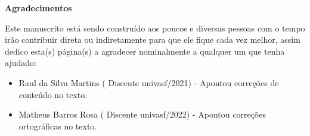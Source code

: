 \begingroup
\thispagestyle{empty}
\begin{center}
	{\normalfont\fontsize{20}{20}\sffamily\selectfont \textbf{Agradecimentos}}\par
\end{center}

\vspace{1cm}

Este manuscrito está sendo construído aos poucos e diversas pessoas com o tempo irão contribuir direta ou indiretamente para que ele fique cada vez melhor, assim dedico esta(s) página(s) a agradecer nominalmente a qualquer um que tenha ajudado:

\begin{itemize}
	\item {\color{red}Raul da Silva Martins} ({\color{blue} Discente univasf/2021}) - Apontou correções de conteúdo no texto.
	\item {\color{red}Matheus Barros Rosa} ({\color{blue} Discente univasf/2022}) - Apontou correções ortográficas no texto.
\end{itemize}

\endgroup